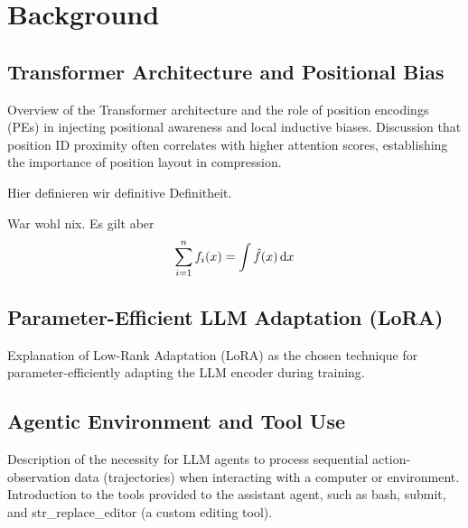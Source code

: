 \chapter{Background}


\section{Transformer Architecture and Positional Bias}

Overview of the Transformer architecture and the role of position encodings (PEs) in injecting positional awareness and local inductive biases. Discussion that position ID proximity often correlates with higher attention scores, establishing the importance of position layout in compression.

\begin{definition}[Definitheit]
  Hier definieren wir definitive Definitheit.
\end{definition}

\begin{theorem}[vom X]
  War wohl nix. Es gilt aber
  \begin{align*}
    \sum_{i=1}^{n} f_i(x) = \int \hat{f}(x) \dl{x}
  \end{align*}
\end{theorem}


\section{Parameter-Efficient LLM Adaptation (LoRA)}

Explanation of Low-Rank Adaptation (LoRA) as the chosen technique for parameter-efficiently adapting the LLM encoder during training.


\section{Agentic Environment and Tool Use}

Description of the necessity for LLM agents to process sequential action-observation data (trajectories) when interacting with a computer or environment. Introduction to the tools provided to the assistant agent, such as bash, submit, and str\_replace\_editor (a custom editing tool).
